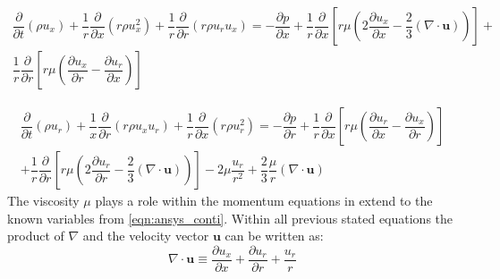 \documentclass[../thesis.tex]{subfiles}
\begin{document}
\begin{gather}
	\dfrac{\partial}{\partial t}(\rho u_x) + \dfrac{1}{r} \dfrac{\partial}{\partial x}(r \rho u_x^2)
	+ \dfrac{1}{r} \dfrac{\partial}{\partial r}(r \rho u_r u_x) = 
	- \dfrac{\partial p}{\partial x} + \dfrac{1}{r} \dfrac{\partial }{\partial x} \left[ 
	r \mu \left( 2 \dfrac{\partial u_x}{\partial x} - \dfrac{2}{3}(\nabla \cdot \mathbf{u}) \right)
	\right] + \\ \nonumber
	\dfrac{1}{r} \dfrac{\partial }{\partial r} \left[ 
	r \mu \left( \dfrac{\partial u_x}{\partial r} - \dfrac{\partial u_r}{\partial x} \right)
	\right]	
\end{gather}


\begin{gather}
	\dfrac{\partial}{\partial t}(\rho u_r) + \dfrac{1}{x} \dfrac{\partial}{\partial r}(r \rho u_x u_r)
	+ \dfrac{1}{r} \dfrac{\partial}{\partial x}(r \rho u_r^2) = 
	- \dfrac{\partial p}{\partial r} + \dfrac{1}{r} \dfrac{\partial }{\partial x} \left[ 
	r \mu \left( \dfrac{\partial u_r}{\partial x} - \dfrac{\partial u_x}{\partial r} \right)
	\right] \\ \nonumber
	+ \dfrac{1}{r} \dfrac{\partial }{\partial r} \left[ 
	r \mu \left( 2 \dfrac{\partial u_r}{\partial r} - \dfrac{2}{3}(\nabla \cdot \mathbf{u}) \right)
	\right] -
	2 \mu \dfrac{u_r}{r^2}+ \dfrac{2}{3} \dfrac{\mu}{r}(\nabla \cdot \mathbf{u})
\end{gather}
The viscosity $\mu$ plays a role within the momentum equations in extend to the known variables from \autoref{eqn:ansys_conti}. 
Within all previous stated equations the product of $\nabla$ and the velocity vector $\mathbf{u}$ can be written as:
\begin{equation}
\nabla \cdot \mathbf{u} \equiv \dfrac{\partial u_x}{\partial x} + \dfrac{\partial u_r}{\partial r}+ \dfrac{u_r}{r}
\end{equation}
\end{document}
